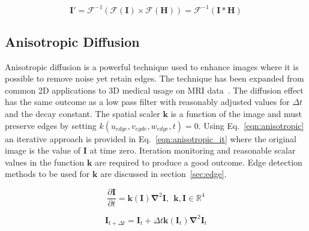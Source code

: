\documentclass[journal]{IEEEtran}
\begin{document}

\begin{equation}
	\textbf{I}' = \mathcal{F}^{-1}(\mathcal{F}(\textbf{I})\times\mathcal{F}(\textbf{H})) = \mathcal{F}^{-1}(\textbf{I}*\textbf{H})		%
	\label{eqn:same} 
\end{equation}


\subsection{Anisotropic Diffusion}
Anisotropic diffusion is a powerful technique used to enhance images where it is possible to remove noise yet retain edges.
The technique has been expanded from common 2D applications to 3D medical usage on MRI data~\cite{nakh11three}.
The diffusion effect has the same outcome as a low pass filter with reasonably adjusted values for $\Delta t$ and the decay constant.
The spatial scaler $\mathbf{k}$ is a function of the image and must preserve edges by setting $k(u_{edge},v_{egde},w_{edge},t) = 0$.
Using Eq.~\eqref{eqn:anisotropic} an iterative approach is provided in Eq.~\eqref{eqn:anisotropic_it} where the original image is the value of $\mathbf{I}$ at time zero.
Iteration monitoring and reasonable scalar values in the function $\mathbf{k}$ are required to produce a good outcome.
Edge detection methods to be used for $\mathbf{k}$ are discussed in section~\ref{sec:edge}.

\begin{equation}
	\frac{\partial \mathbf{I}}{\partial t} = \mathbf{k(\mathbf{I})} \mathbf{\nabla}^2 \mathbf{I},\:\:\mathbf{k},\mathbf{I} \in \mathbb{R}^4
	\label{eqn:anisotropic} 
\end{equation}

\begin{equation}
	\mathbf{I}_{t + \Delta t} = \mathbf{I}_t + \Delta t\mathbf{k}(\mathbf{I}_t)\mathbf{\nabla}^2\mathbf{I}_t
	\label{eqn:anisotropic_it} 
\end{equation}
\end{document}
